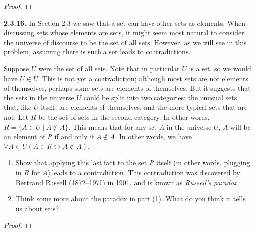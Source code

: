 \documentclass[12pt]{amsart}
\newenvironment{statement}[1]{\smallskip\noindent\color[rgb]{.6627, .3529, .6314} {\bf #1.}}{}
\theoremstyle{definition}
\theoremstyle{remark}
\begin{document}
\begin{proof}
\end{proof}


\begin{statement}{2.3.16}
In Section 2.3 we saw that a set can have other sets as elements.
When discussing sets whose elements are sets, it might seem most natural to consider the universe of discourse to be the set of all sets.
However, as we will see in this problem, assuming there is such a set leads to contradictions.

Suppose $U$ were the set of all sets.
Note that in particular $U$ is a set, so we would have $U \in U$.
This is not yet a contradiction;
although most sets are not elements of themselves, perhaps some sets are elements of themselves.
But it suggests that the sets in the universe $U$ could be split into two categories:
the unusual sets that, like $U$ itself, are elements of themselves,
and the more typical sets that are not.
Let $R$ be the set of sets in the second category.
In other words, $R = \{ A \in U \mid A \notin A \}$.
This means that for any set $A$ in the universe $U$,
$A$ will be an element of $R$ if and only if $A \notin A$.
In other words, we have $\forall A \in U (A \in R \leftrightarrow A \notin A)$.
\begin{enumerate}
	\item Show that applying this last fact to the set $R$ itself
	(in other words, plugging in $R$ for $A$) leads to a contradiction.
	This contradiction was discovered by Bertrand Russell (1872--1970) in 1901,
	and is known as \emph{Russell's paradox}.
	
	\item Think some more about the paradox in part (1).
	What do you think it tells us about sets?
\end{enumerate}
\end{statement}

\begin{proof}
\end{proof}
\end{document}
